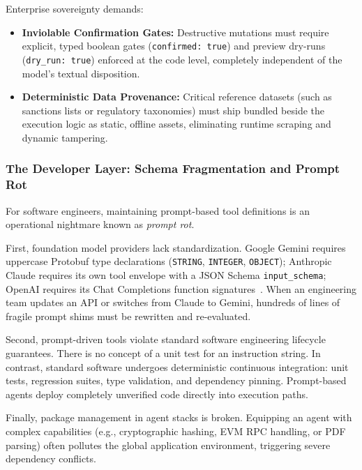 Enterprise sovereignty demands:
\begin{itemize}[leftmargin=*]
  \item \textbf{Inviolable Confirmation Gates:} Destructive mutations must require explicit, typed boolean gates (\texttt{confirmed: true}) and preview dry-runs (\texttt{dry\_run: true}) enforced at the code level, completely independent of the model's textual disposition.
  \item \textbf{Deterministic Data Provenance:} Critical reference datasets (such as sanctions lists or regulatory taxonomies) must ship bundled beside the execution logic as static, offline assets, eliminating runtime scraping and dynamic tampering.
\end{itemize}

\subsubsection{The Developer Layer: Schema Fragmentation and Prompt Rot}
For software engineers, maintaining prompt-based tool definitions is an operational nightmare known as \emph{prompt rot}. 

First, foundation model providers lack standardization. Google Gemini requires uppercase Protobuf type declarations (\texttt{STRING}, \texttt{INTEGER}, \texttt{OBJECT}); Anthropic Claude requires its own tool envelope with a JSON Schema \texttt{input\_schema}; OpenAI requires its Chat Completions function signatures~\cite{anthropic2024mcp}. When an engineering team updates an API or switches from Claude to Gemini, hundreds of lines of fragile prompt shims must be rewritten and re-evaluated.

Second, prompt-driven tools violate standard software engineering lifecycle guarantees. There is no concept of a unit test for an instruction string. In contrast, standard software undergoes deterministic continuous integration: unit tests, regression suites, type validation, and dependency pinning. Prompt-based agents deploy completely unverified code directly into execution paths.

Finally, package management in agent stacks is broken. Equipping an agent with complex capabilities (e.g., cryptographic hashing, EVM RPC handling, or PDF parsing) often pollutes the global application environment, triggering severe dependency conflicts.

